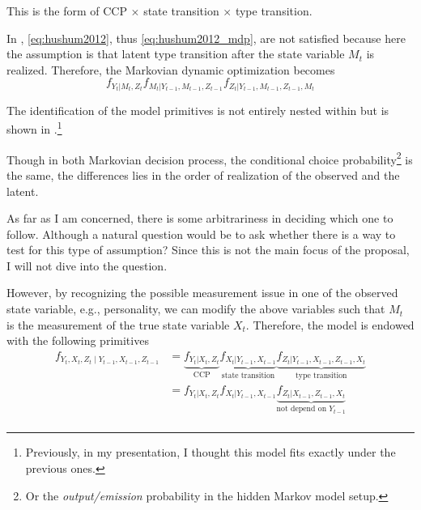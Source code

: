 \documentclass[12pt]{article}
\begin{document}
This is the form of CCP $\times$ state transition $\times$ type transition.

In \citet{todd2020dynamic}, \ref{eq:hushum2012}, thus \ref{eq:hushum2012_mdp}, are not satisfied because here the assumption is that latent type transition after the state variable $M_t$ is realized. Therefore, the Markovian dynamic optimization becomes
\begin{equation}\label{eq:huetal2015_mdp}
    f_{Y_t|M_t,Z_t}f_{M_t|Y_{t-1},M_{t-1},Z_{t-1}}f_{Z_t|Y_{t-1},M_{t-1},Z_{t-1},M_t}
\end{equation}

The identification of the model primitives is not entirely nested within \citet{hu2012nonparametric} but is shown in \citet{hu2017simple}.\footnote{Previously, in my presentation, I thought this model fits exactly under the previous ones.}

Though in both Markovian decision process, the conditional choice probability\footnote{Or the \textit{output/emission} probability in the hidden Markov model setup.} is the same, the differences lies in the order of realization of the observed and the latent.

As far as I am concerned, there is some arbitrariness in deciding which one to follow. Although a natural question would be to ask whether there is a way to test for this type of assumption? Since this is not the main focus of the proposal, I will not dive into the question.

However, by recognizing the possible measurement issue in one of the observed state variable, e.g., personality, we can modify the above variables such that $M_t$ is the measurement of the true state variable $X_t$. Therefore, the model is endowed with the following primitives
\begin{equation}
    \begin{split}
        f_{Y_t, X_t, Z_t\mid Y_{t-1},X_{t-1}, Z_{t-1}} & =\underbrace{f_{Y_t|X_t,Z_t}}_{\text{CCP}}\underbrace{f_{X_t|Y_{t-1},X_{t-1}}}_{\text{state transition}}\underbrace{f_{Z_t|Y_{t-1},X_{t-1},Z_{t-1},X_t}}_{\text{type transition}} \\
                                                       & =f_{Y_t|X_t,Z_t}f_{X_t|Y_{t-1},X_{t-1}}\underbrace{f_{Z_t|X_{t-1},Z_{t-1},X_t}}_{\text{not depend on $Y_{t-1}$}}                                                                  \\
    \end{split}
\end{equation}
\end{document}
